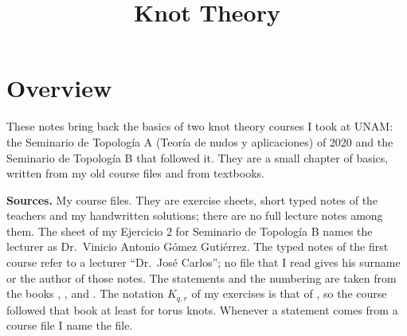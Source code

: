



\title{Knot Theory}
\maketitle

\label{section-phantom}

\tableofcontents

\section{Overview}
\label{section-overview}

\noindent
These notes bring back the basics of two
knot theory courses I took at UNAM: the
Seminario de Topolog\'ia A (Teor\'ia de
nudos y aplicaciones) of 2020 and the
Seminario de Topolog\'ia B that followed
it. They are a small chapter of basics,
written from my old course files and
from textbooks.

\medskip\noindent
{\bf Sources.} My course files. They are exercise
sheets, short typed notes of the
teachers and my handwritten solutions;
there are no full lecture notes among
them. The sheet of my Ejercicio 2 for
Seminario de Topolog\'ia B names the
lecturer as Dr.\ Vinicio Antonio G\'omez
Guti\'errez. The typed notes of the
first course refer to a lecturer
``Dr.\ Jos\'e Carlos''; no file that I
read gives his surname or the author of
those notes. The statements and the
numbering are taken from the books
\cite{murasugi}, \cite{lickorish},
\cite{adams-knot-book} and
\cite{hatcher}. The notation
$K_{q,r}$ of my exercises is that of
\cite[Chapter 7]{murasugi}, so the
course followed that book at least for
torus knots. Whenever a statement comes
from a course file I name the file.


